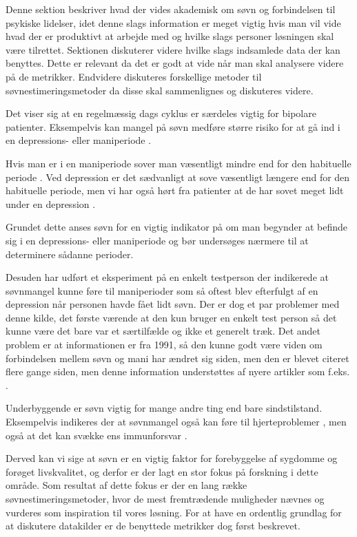 Denne sektion beskriver hvad der vides akademisk om søvn og forbindelsen til psykiske lidelser, idet denne slags information er meget vigtig hvis man vil vide hvad der er produktivt at arbejde med og hvilke slags personer løsningen skal være tilrettet. 
Sektionen diskuterer videre hvilke slags indsamlede data der kan benyttes. 
Dette er relevant da det er godt at vide når man skal analysere videre på de metrikker. 
Endvidere diskuteres forskellige metoder til søvnestimeringsmetoder da disse skal sammenlignes og diskuteres videre.

Det viser sig at en regelmæssig dags cyklus er særdeles vigtig for bipolare patienter.
Eksempelvis kan mangel på søvn medføre større risiko for at gå ind i en depressions- eller maniperiode \citep{CPSP:CPSP1164}.

Hvis man er i en maniperiode sover man væsentligt mindre end for den habituelle periode \citep{CPSP:CPSP1164}.
Ved depression er det sædvanligt at sove væsentligt længere end for den habituelle periode, men vi har også hørt fra patienter at de har sovet meget lidt under en depression \citep[Kapitel 2, Sektion 5]{misc:faellesrapp}.

Grundet dette anses søvn for en vigtig indikator på om man begynder at befinde sig i en depressions- eller maniperiode og bør undersøges nærmere til at determinere sådanne perioder.

Desuden har \citet{art:sleepCusMania} udført et eksperiment på en enkelt testperson der indikerede at søvnmangel kunne føre til maniperioder som så oftest blev efterfulgt af en depression når personen havde fået lidt søvn.
Der er dog et par problemer med denne kilde, det første værende at den kun bruger en enkelt test person så det kunne være det bare var et særtilfælde og ikke et generelt træk.
Det andet problem er at informationen er fra 1991, så den kunne godt være viden om forbindelsen mellem søvn og mani har ændret sig siden, men den er blevet citeret flere gange siden, men denne information understøttes af nyere artikler som f.eks. \citet{Riemann2001}.

Underbyggende er søvn vigtig for mange andre ting end bare sindstilstand.
Eksempelvis indikeres der at søvnmangel også kan føre til hjerteproblemer \citep{Mullington2009294,art:sleeplossHeart}, men også at det kan svække ens immunforsvar \citep{misc:sleepImmune}.

Derved kan vi sige at søvn er en vigtig faktor for forebyggelse af sygdomme og forøget livskvalitet, og derfor er der lagt en stor fokus på forskning i dette område.
Som resultat af dette fokus er der en lang række søvnestimeringsmetoder, hvor de mest fremtrædende muligheder nævnes og vurderes som inspiration til vores løsning.
For at have en ordentlig grundlag for at diskutere datakilder er de benyttede metrikker dog først beskrevet.

